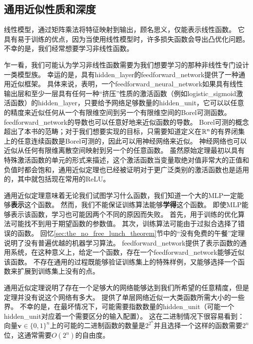 \subsection{通用近似性质和深度}
\label{sec:universal_approximation_properties_and_depth}

线性模型，通过矩阵乘法将特征映射到输出，顾名思义，仅能表示线性函数。
它具有易于训练的优点，因为当使用线性模型时，许多损失函数会导出凸优化问题。
不幸的是，我们经常想要学习非线性函数。

乍一看，我们可能认为学习非线性函数需要为我们想要学习的那种非线性专门设计一类模型族。
幸运的是，具有\gls{hidden_layer}的\gls{feedforward_network}提供了一种通用近似框架。
具体来说，\citep{Hornik89,Cybenko89}表明，一个\gls{feedforward_neural_network}如果具有线性输出层和至少一层具有任何一种``挤压''性质的激活函数（例如\gls{logistic_sigmoid}激活函数）的\gls{hidden_layer}，只要给予网络足够数量的\gls{hidden_unit}，它可以以任意的精度来近似任何从一个有限维空间到另一个有限维空间的Borel可测函数。
\gls{feedforward_network}的导数也可以任意好地来近似函数的导数\citep{hornik1990universal}。
Borel可测的概念超出了本书的范畴；对于我们想要实现的目标，只需要知道定义在$\mathbb{R}^n$的有界闭集上的任意连续函数是Borel可测的，因此可以用神经网络来近似。
神经网络也可以近似从任何有限维离散空间映射到另一个的任意函数。
虽然原始定理最初以具有特殊激活函数的单元的形式来描述，这个激活函数当变量取绝对值非常大的正值和负值时都会饱和，通用近似定理也已经被证明对于更广泛类别的激活函数也是适用的，其中就包括现在常用的\gls{ReLU}\citep{Leshno-et-al-1993}。


通用近似定理意味着无论我们试图学习什么函数，我们知道一个大的MLP一定能够\textbf{表示}这个函数。
然而，我们不能保证训练算法能够\textbf{学得}这个函数。
即使MLP能够表示该函数，学习也可能因两个不同的原因而失败。
首先，用于训练的优化算法可能找不到用于期望函数的参数值。
其次，训练算法可能由于过拟合选择了错误的函数。
回忆\ref{sec:the_no_free_lunch_theorem}节中的``没有免费的午餐''定理说明了没有普遍优越的机器学习算法。
\gls{feedforward_network}提供了表示函数的通用系统，在这种意义上，给定一个函数，存在一个\gls{feedforward_network}能够近似该函数。
不存在通用的过程既能够验证训练集上的特殊样例，又能够选择一个函数来扩展到训练集上没有的点。

通用近似定理说明了存在一个足够大的网络能够达到我们所希望的任意精度，但是定理并没有说这个网络有多大。
\cite{Barron93}提供了单层网络近似一大类函数所需大小的一些界。
不幸的是，在最坏情况下，可能需要指数数量的\gls{hidden_unit}（可能一个\gls{hidden_unit}对应着一个需要区分的输入配置）。
这在二进制情况下很容易看到：向量$\bm{v}\in \{0,1\}^n$上的可能的二进制函数的数量是$2^{2^n}$并且选择一个这样的函数需要$2^n$位，这通常需要$O(2^n)$的自由度。

